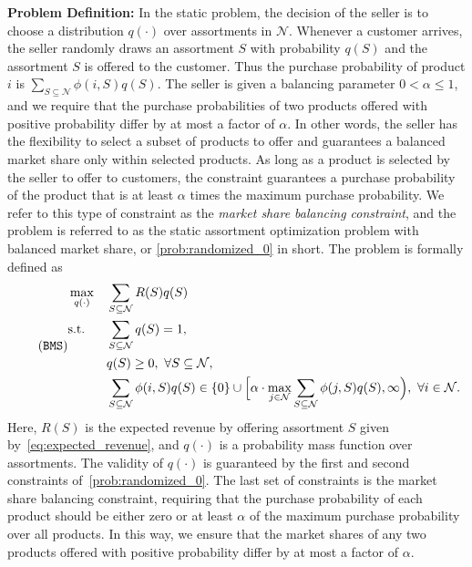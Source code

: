 \documentclass[mnsc,non-blindrev]{informs3}
\theoremstyle{definition}
\begin{document}
\noindent\textbf{Problem Definition:} In the static problem, the decision of the seller is to choose a distribution $q(\cdot)$ over assortments in $\mathcal{N}$. Whenever a customer arrives, the seller randomly draws an assortment $S$ with probability $q(S)$ and the assortment $S$ is offered to the customer. Thus the purchase probability of product $i$ is $\sum_{S\subseteq\mathcal{N}}\phi(i,S)q(S)$. The seller is given a balancing parameter $0<\alpha\leq 1$, and we require that the purchase probabilities of two products offered with positive probability differ by at most a factor of $\alpha$. In other words, the seller has the flexibility to select a subset of products to offer and guarantees a balanced market share only within selected products. As long as a product is selected by the seller to offer to customers, the constraint guarantees a purchase probability of the product that is at least $\alpha$ times the maximum purchase probability. We refer to this type of constraint as the {\it market share balancing constraint}, and the problem is referred to as the static assortment optimization problem with balanced market share, or \ref{prob:randomized_0} in short. The problem is formally defined as
\begin{equation}
\label{prob:randomized_0}
\tag{\texttt{BMS}}
\begin{aligned}
&\max_{q(\cdot)} && \sum_{S\subseteq\mathcal{N}}R(S)q(S)\\
&\textup{s.t.} && \sum_{S\subseteq\mathcal{N}}q(S)=1,\\
&&&q(S)\geq 0,\ \forall S\subseteq\mathcal{N},\\
&&&\sum_{S\subseteq\mathcal{N}}\phi(i,S)q(S)\in\{0\}\cup\Big[ \alpha\cdot\max_{j\in\mathcal{N}}\sum_{S\subseteq\mathcal{N}}\phi(j,S)q(S),\infty\Big),\ \forall i\in\mathcal{N}.
\end{aligned}
\end{equation}
Here, $R(S)$ is the expected revenue by offering assortment $S$ given by~\eqref{eq:expected_revenue}, and $q(\cdot)$ is a probability mass function over assortments. The validity of $q(\cdot)$ is guaranteed by the first and second constraints of~\ref{prob:randomized_0}. The last set of constraints is the market share balancing constraint, requiring that the purchase probability of each product should be either zero or at least $\alpha$ of the maximum purchase probability over all products. In this way, we ensure that the market shares of any two products offered with positive probability differ by at most a factor of $\alpha$. 
\end{document}
